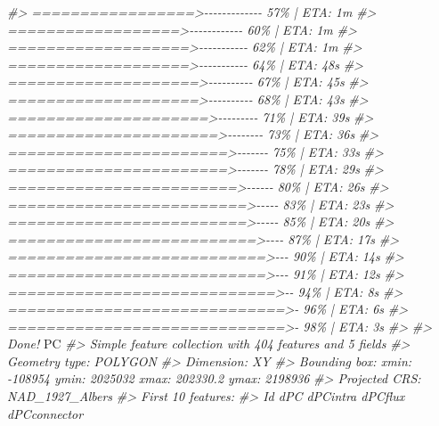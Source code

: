 \documentclass[
]{book}
\newenvironment{Shaded}{\begin{snugshade}}{\end{snugshade}}
\newcommand{\CommentTok}[1]{\textcolor[rgb]{0.56,0.35,0.01}{\textit{#1}}}
\newcommand{\NormalTok}[1]{#1}
\begin{document}
\begin{Shaded}
\begin{Highlighting}[]
\CommentTok{\#\textgreater{}  =================\textgreater{}{-}{-}{-}{-}{-}{-}{-}{-}{-}{-}{-}{-}{-}   57\% |  ETA:  1m}
\CommentTok{\#\textgreater{}  ==================\textgreater{}{-}{-}{-}{-}{-}{-}{-}{-}{-}{-}{-}{-}   60\% |  ETA:  1m}
\CommentTok{\#\textgreater{}  ===================\textgreater{}{-}{-}{-}{-}{-}{-}{-}{-}{-}{-}{-}   62\% |  ETA:  1m}
\CommentTok{\#\textgreater{}  ===================\textgreater{}{-}{-}{-}{-}{-}{-}{-}{-}{-}{-}{-}   64\% |  ETA: 48s}
\CommentTok{\#\textgreater{}  ====================\textgreater{}{-}{-}{-}{-}{-}{-}{-}{-}{-}{-}   67\% |  ETA: 45s}
\CommentTok{\#\textgreater{}  ====================\textgreater{}{-}{-}{-}{-}{-}{-}{-}{-}{-}{-}   68\% |  ETA: 43s}
\CommentTok{\#\textgreater{}  =====================\textgreater{}{-}{-}{-}{-}{-}{-}{-}{-}{-}   71\% |  ETA: 39s}
\CommentTok{\#\textgreater{}  ======================\textgreater{}{-}{-}{-}{-}{-}{-}{-}{-}   73\% |  ETA: 36s}
\CommentTok{\#\textgreater{}  =======================\textgreater{}{-}{-}{-}{-}{-}{-}{-}   75\% |  ETA: 33s}
\CommentTok{\#\textgreater{}  =======================\textgreater{}{-}{-}{-}{-}{-}{-}{-}   78\% |  ETA: 29s}
\CommentTok{\#\textgreater{}  ========================\textgreater{}{-}{-}{-}{-}{-}{-}   80\% |  ETA: 26s}
\CommentTok{\#\textgreater{}  =========================\textgreater{}{-}{-}{-}{-}{-}   83\% |  ETA: 23s}
\CommentTok{\#\textgreater{}  =========================\textgreater{}{-}{-}{-}{-}{-}   85\% |  ETA: 20s}
\CommentTok{\#\textgreater{}  ==========================\textgreater{}{-}{-}{-}{-}   87\% |  ETA: 17s}
\CommentTok{\#\textgreater{}  ===========================\textgreater{}{-}{-}{-}   90\% |  ETA: 14s}
\CommentTok{\#\textgreater{}  ===========================\textgreater{}{-}{-}{-}   91\% |  ETA: 12s}
\CommentTok{\#\textgreater{}  ============================\textgreater{}{-}{-}   94\% |  ETA:  8s}
\CommentTok{\#\textgreater{}  =============================\textgreater{}{-}   96\% |  ETA:  6s}
\CommentTok{\#\textgreater{}  =============================\textgreater{}{-}   98\% |  ETA:  3s}
\CommentTok{\#\textgreater{} }
\CommentTok{\#\textgreater{} Done!}
\NormalTok{PC}
\CommentTok{\#\textgreater{} Simple feature collection with 404 features and 5 fields}
\CommentTok{\#\textgreater{} Geometry type: POLYGON}
\CommentTok{\#\textgreater{} Dimension:     XY}
\CommentTok{\#\textgreater{} Bounding box:  xmin: {-}108954 ymin: 2025032 xmax: 202330.2 ymax: 2198936}
\CommentTok{\#\textgreater{} Projected CRS: NAD\_1927\_Albers}
\CommentTok{\#\textgreater{} First 10 features:}
\CommentTok{\#\textgreater{}    Id       dPC  dPCintra   dPCflux dPCconnector}

\end{Highlighting}
\end{Shaded}
\end{document}
